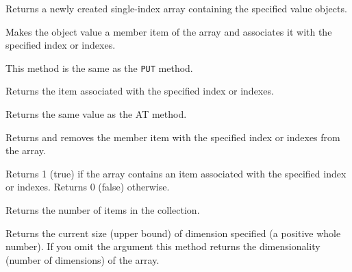 

Returns a newly created single-index array containing the specified
value objects.



Makes the object value a member item of the array and associates it with
the specified index or indexes.



This method is the same as the \texttt{PUT} method.



Returns the item associated with the specified index or indexes.



Returns the same value as the AT method.



Returns and removes the member item with the specified index or indexes
from the array.



Returns 1 (true) if the array contains an item associated with the
specified index or indexes. Returns 0 (false) otherwise.



Returns the number of items in the collection.



Returns the current size (upper bound) of dimension specified (a
positive whole number). If you omit the argument this method returns the
dimensionality (number of dimensions) of the array.

